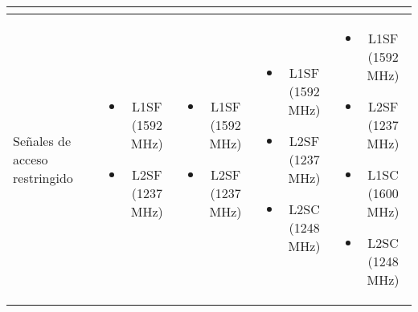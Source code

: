 \begin{center}
\begin{longtable}{|p{3cm}|c|c|c|c|}
{{\begin{itemize}[label={}, leftmargin=0pt, topsep=0pt, partopsep=0pt, parsep=0pt, itemsep=0pt]
                \end{itemize}
                \vspace{10pt}
            }
        } \\
        \hline
        \cellcolor{lightblue}Señales de acceso restringido &
        \parbox[t]{2.5cm}{
            \vspace{-7pt}
            {\fontsize{9}{11}\selectfont
                \begin{itemize}[label={}, leftmargin=0pt, topsep=0pt, partopsep=0pt, parsep=0pt, itemsep=0pt]
                    \item L1SF (1592 MHz)
                    \item L2SF (1237 MHz)
                \end{itemize}
            }
        } &
        \parbox[t]{2.5cm}{
            \vspace{-7pt}
            {\fontsize{9}{11}\selectfont
                \begin{itemize}[label={}, leftmargin=0pt, topsep=0pt, partopsep=0pt, parsep=0pt, itemsep=0pt]
                    \item L1SF (1592 MHz)
                    \item L2SF (1237 MHz)
                \end{itemize}
            }
        } &
        \parbox[t]{2.5cm}{
            \vspace{-7pt}
            {\fontsize{9}{11}\selectfont
                \begin{itemize}[label={}, leftmargin=0pt, topsep=0pt, partopsep=0pt, parsep=0pt, itemsep=0pt]
                    \item L1SF (1592 MHz)
                    \item L2SF (1237 MHz)
                    \item L2SC (1248 MHz)
                \end{itemize}
            }
        } &
        \parbox[t]{2.5cm}{
            \vspace{-7pt}
            {\fontsize{9}{11}\selectfont
                \begin{itemize}[label={}, leftmargin=0pt, topsep=0pt, partopsep=0pt, parsep=0pt, itemsep=0pt]
                    \item L1SF (1592 MHz)
                    \item L2SF (1237 MHz)
                    \item L1SC (1600 MHz)
                    \item L2SC (1248 MHz)
                \end{itemize}
                \vspace{10pt}
            }
        } \\
    \end{longtable}    
\end{center}

